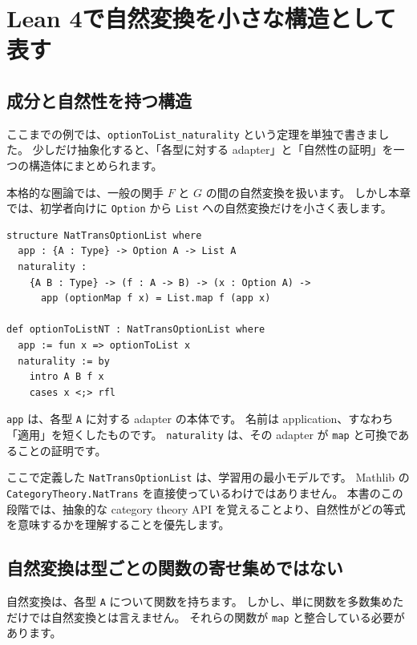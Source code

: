 \section{Lean 4で自然変換を小さな構造として表す}

\subsection{成分と自然性を持つ構造}

ここまでの例では、\texttt{optionToList\_naturality} という定理を単独で書きました。
少しだけ抽象化すると、「各型に対する adapter」と「自然性の証明」を一つの構造体にまとめられます。

本格的な圏論では、一般の関手 \(F\) と \(G\) の間の自然変換を扱います。
しかし本章では、初学者向けに \texttt{Option} から \texttt{List} への自然変換だけを小さく表します。

\begin{listing}[htbp]
\begin{verbatim}
structure NatTransOptionList where
  app : {A : Type} -> Option A -> List A
  naturality :
    {A B : Type} -> (f : A -> B) -> (x : Option A) ->
      app (optionMap f x) = List.map f (app x)

def optionToListNT : NatTransOptionList where
  app := fun x => optionToList x
  naturality := by
    intro A B f x
    cases x <;> rfl
\end{verbatim}
\caption{\texttt{NatTransOptionList}}
\label{lst:ch15_nattrans_structure}
\end{listing}

\texttt{app} は、各型 \texttt{A} に対する adapter の本体です。
名前は application、すなわち「適用」を短くしたものです。
\texttt{naturality} は、その adapter が \texttt{map} と可換であることの証明です。

ここで定義した \texttt{NatTransOptionList} は、学習用の最小モデルです。
Mathlib の \texttt{CategoryTheory.NatTrans} を直接使っているわけではありません。
本書のこの段階では、抽象的な category theory API を覚えることより、自然性がどの等式を意味するかを理解することを優先します。

\subsection{自然変換は型ごとの関数の寄せ集めではない}

自然変換は、各型 \texttt{A} について関数を持ちます。
しかし、単に関数を多数集めただけでは自然変換とは言えません。
それらの関数が \texttt{map} と整合している必要があります。

